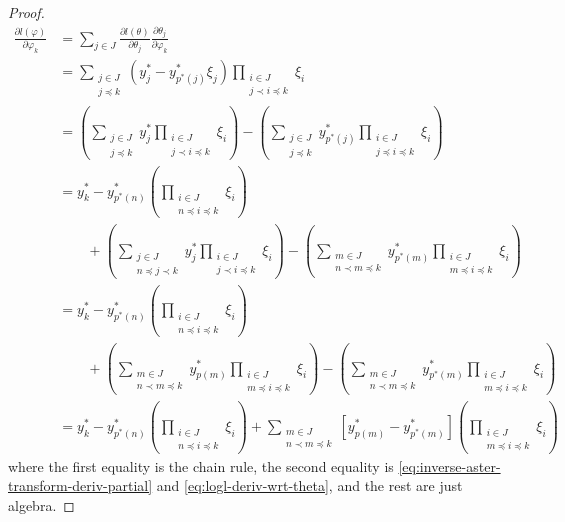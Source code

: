 \begin{proof}
\begin{align*}
   \frac{\partial l(\varphi)}{\partial \varphi_k}
   & =
   \sum_{j \in J}
   \frac{\partial l(\theta)}{\partial \theta_j}
   \frac{\partial \theta_j}{\partial \varphi_k}
   \\
   & =
   \sum_{\substack{j \in J \\ j \preceq k}}
   ( y^*_j - y^*_{p^*(j)} \xi_j )
   \prod_{\substack{i \in J \\ j \prec i \preceq k}} \xi_i
   \\
   & =
   \left(
   \sum_{\substack{j \in J \\ j \preceq k}}
   y^*_j
   \prod_{\substack{i \in J \\ j \prec i \preceq k}} \xi_i
   \right)
   -
   \left(
   \sum_{\substack{j \in J \\ j \preceq k}}
   y^*_{p^*(j)}
   \prod_{\substack{i \in J \\ j \preceq i \preceq k}} \xi_i
   \right)
   \\
   & =
   y^*_k
   -
   y^*_{p^*(n)}
   \left(
   \prod_{\substack{i \in J \\ n \preceq i \preceq k}} \xi_i
   \right)
   \\
   & \qquad
   +
   \left(
   \sum_{\substack{j \in J \\ n \preceq j \prec k}}
   y^*_j
   \prod_{\substack{i \in J \\ j \prec i \preceq k}} \xi_i
   \right)
   -
   \left(
   \sum_{\substack{m \in J \\ n \prec m \preceq k}}
   y^*_{p^*(m)}
   \prod_{\substack{i \in J \\ m \preceq i \preceq k}} \xi_i
   \right)
   \\
   & =
   y^*_k
   -
   y^*_{p^*(n)}
   \left(
   \prod_{\substack{i \in J \\ n \preceq i \preceq k}} \xi_i
   \right)
   \\
   & \qquad
   +
   \left(
   \sum_{\substack{m \in J \\ n \prec m \preceq k}}
   y^*_{p(m)}
   \prod_{\substack{i \in J \\ m \preceq i \preceq k}} \xi_i
   \right)
   -
   \left(
   \sum_{\substack{m \in J \\ n \prec m \preceq k}}
   y^*_{p^*(m)}
   \prod_{\substack{i \in J \\ m \preceq i \preceq k}} \xi_i
   \right)
   \\
   & =
   y^*_k
   -
   y^*_{p^*(n)}
   \left(
   \prod_{\substack{i \in J \\ n \preceq i \preceq k}} \xi_i
   \right)
   +
   \sum_{\substack{m \in J \\ n \prec m \preceq k}}
   \left[ y^*_{p(m)} - y^*_{p^*(m)} \right]
   \left(
   \prod_{\substack{i \in J \\ m \preceq i \preceq k}} \xi_i
   \right)
\end{align*}
where the first equality is the chain rule,
the second equality is \eqref{eq:inverse-aster-transform-deriv-partial}
and \eqref{eq:logl-deriv-wrt-theta}, and the rest are just algebra.
\end{proof}

